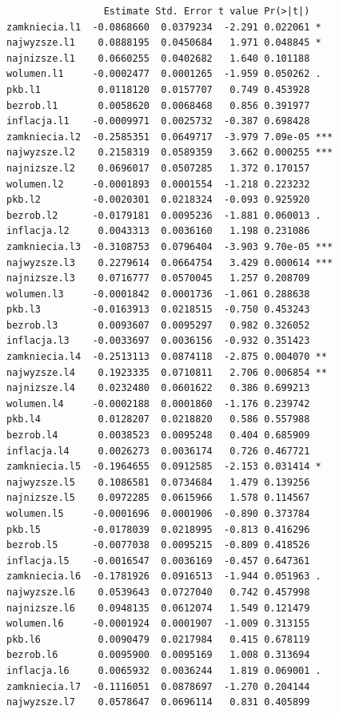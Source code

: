 \documentclass[
  polish,
  letterpaper,
  DIV=11,
  numbers=noendperiod]{scrartcl}
\begin{document}
\begin{verbatim}
                 Estimate Std. Error t value Pr(>|t|)    
zamkniecia.l1  -0.0868660  0.0379234  -2.291 0.022061 *  
najwyzsze.l1    0.0888195  0.0450684   1.971 0.048845 *  
najnizsze.l1    0.0660255  0.0402682   1.640 0.101188    
wolumen.l1     -0.0002477  0.0001265  -1.959 0.050262 .  
pkb.l1          0.0118120  0.0157707   0.749 0.453928    
bezrob.l1       0.0058620  0.0068468   0.856 0.391977    
inflacja.l1    -0.0009971  0.0025732  -0.387 0.698428    
zamkniecia.l2  -0.2585351  0.0649717  -3.979 7.09e-05 ***
najwyzsze.l2    0.2158319  0.0589359   3.662 0.000255 ***
najnizsze.l2    0.0696017  0.0507285   1.372 0.170157    
wolumen.l2     -0.0001893  0.0001554  -1.218 0.223232    
pkb.l2         -0.0020301  0.0218324  -0.093 0.925920    
bezrob.l2      -0.0179181  0.0095236  -1.881 0.060013 .  
inflacja.l2     0.0043313  0.0036160   1.198 0.231086    
zamkniecia.l3  -0.3108753  0.0796404  -3.903 9.70e-05 ***
najwyzsze.l3    0.2279614  0.0664754   3.429 0.000614 ***
najnizsze.l3    0.0716777  0.0570045   1.257 0.208709    
wolumen.l3     -0.0001842  0.0001736  -1.061 0.288638    
pkb.l3         -0.0163913  0.0218515  -0.750 0.453243    
bezrob.l3       0.0093607  0.0095297   0.982 0.326052    
inflacja.l3    -0.0033697  0.0036156  -0.932 0.351423    
zamkniecia.l4  -0.2513113  0.0874118  -2.875 0.004070 ** 
najwyzsze.l4    0.1923335  0.0710811   2.706 0.006854 ** 
najnizsze.l4    0.0232480  0.0601622   0.386 0.699213    
wolumen.l4     -0.0002188  0.0001860  -1.176 0.239742    
pkb.l4          0.0128207  0.0218820   0.586 0.557988    
bezrob.l4       0.0038523  0.0095248   0.404 0.685909    
inflacja.l4     0.0026273  0.0036174   0.726 0.467721    
zamkniecia.l5  -0.1964655  0.0912585  -2.153 0.031414 *  
najwyzsze.l5    0.1086581  0.0734684   1.479 0.139256    
najnizsze.l5    0.0972285  0.0615966   1.578 0.114567    
wolumen.l5     -0.0001696  0.0001906  -0.890 0.373784    
pkb.l5         -0.0178039  0.0218995  -0.813 0.416296    
bezrob.l5      -0.0077038  0.0095215  -0.809 0.418526    
inflacja.l5    -0.0016547  0.0036169  -0.457 0.647361    
zamkniecia.l6  -0.1781926  0.0916513  -1.944 0.051963 .  
najwyzsze.l6    0.0539643  0.0727040   0.742 0.457998    
najnizsze.l6    0.0948135  0.0612074   1.549 0.121479    
wolumen.l6     -0.0001924  0.0001907  -1.009 0.313155    
pkb.l6          0.0090479  0.0217984   0.415 0.678119    
bezrob.l6       0.0095900  0.0095169   1.008 0.313694    
inflacja.l6     0.0065932  0.0036244   1.819 0.069001 .  
zamkniecia.l7  -0.1116051  0.0878697  -1.270 0.204144    
najwyzsze.l7    0.0578647  0.0696114   0.831 0.405899    

\end{verbatim}
\end{document}
